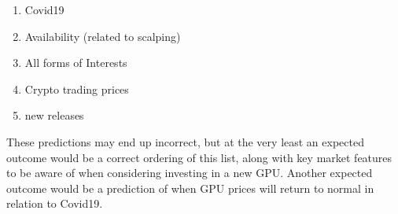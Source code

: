 \documentclass[letterpaper, 10 pt, conference]{ieeeconf}  %
\begin{document}
\begin{enumerate}
    \item Covid19
    \item Availability (related to scalping)
    \item All forms of Interests
    \item Crypto trading prices
    \item new releases
\end{enumerate}

These predictions may end up incorrect, but at the very least an expected outcome would be a correct ordering of this list, along with key market features to be aware of when considering investing in a new GPU. Another expected outcome would be a prediction of when GPU prices will return to normal in relation to Covid19.

   

\addtolength{\textheight}{-12cm}   %
\end{document}
